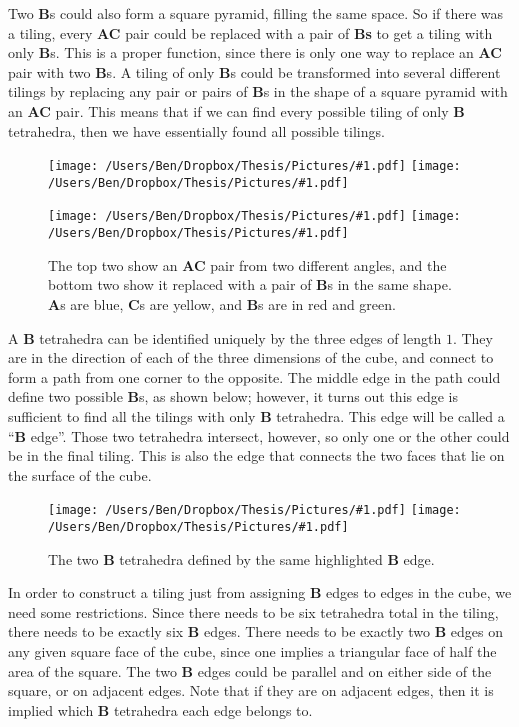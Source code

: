 \documentclass[12pt]{scrippsthesis}
\newcommand{\pic}[2]{\texttt{[image: /Users/Ben/Dropbox/Thesis/Pictures/\#1.pdf]}}
\theoremstyle{definition}
\theoremstyle{remark}
\theoremstyle{plain}
\begin{document}
Two {\bf B}s could also form a square pyramid, filling the same space.  So if there was a tiling, every {\bf AC} pair could be replaced with a pair of {\bf Bs} to get a tiling with only {\bf B}s.  This is a proper function, since there is only one way to replace an {\bf AC} pair with two {\bf B}s.  A tiling of only {\bf B}s could be transformed into several different tilings by replacing any pair or pairs of {\bf B}s in the shape of a square pyramid with an {\bf AC} pair.  This means that if we can find every possible tiling of only {\bf B} tetrahedra, then we have essentially found all possible tilings.  

\begin{figure}[H]
\centerline{\hfill
\pic{ACpyramid}{width=2in}\hfill
\pic{ACpyramid2}{width=2in}\hfill}
\vspace{.15in}
\centerline{\hfill
\pic{BBpyramid}{width=2in}\hfill
\pic{BBpyramid2}{width=2in}\hfill}
\caption{The top two show an {\bf AC} pair from two different angles, and the bottom two show it replaced with a pair of {\bf B}s in the same shape.  {\bf A}s are blue, {\bf C}s are yellow, and {\bf B}s are in red and green.}
\end{figure}

A {\bf B} tetrahedra can be identified uniquely by the three edges of length $1$.  They are in the direction of each of the three dimensions of the cube, and connect to form a path from one corner to the opposite.  The middle edge in the path could define two possible {\bf B}s, as shown below; however, it turns out this edge is sufficient to find all the tilings with only {\bf B} tetrahedra.  This edge will be called a ``{\bf B} edge''.  Those two tetrahedra intersect, however, so only one or the other could be in the final tiling.  This is also the edge that connects the two faces that lie on the surface of the cube.  

\begin{figure}[H]
\centerline{\hfill
\pic{Bedge}{width=2in}\hfill
\pic{Bedge2}{width=2in}\hfill}
\caption{The two {\bf B} tetrahedra defined by the same highlighted {\bf B} edge.}
\end{figure}

In order to construct a tiling just from assigning {\bf B} edges to edges in the cube, we need some restrictions.  Since there needs to be six tetrahedra total in the tiling, there needs to be exactly six {\bf B} edges.  There needs to be exactly two {\bf B} edges on any given square face of the cube, since one implies a triangular face of half the area of the square.  The two {\bf B} edges could be parallel and on either side of the square, or on adjacent edges.  Note that if they are on adjacent edges, then it is implied which {\bf B} tetrahedra each edge belongs to.  
\end{document}
